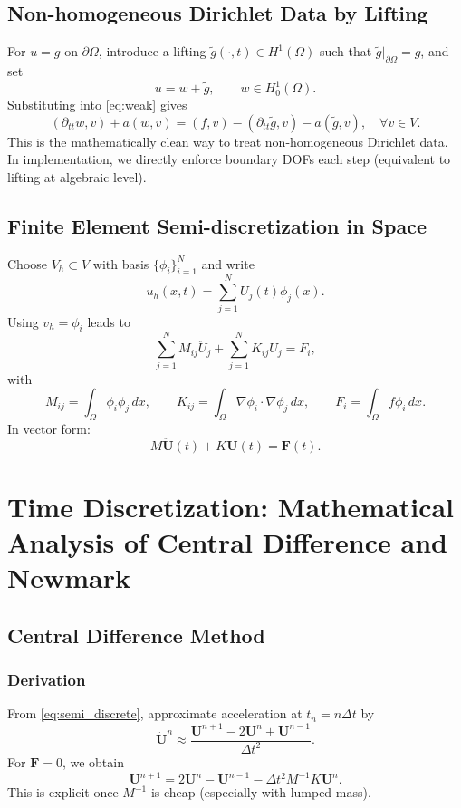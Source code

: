 \documentclass[11pt,a4paper]{report}
\begin{document}
\section{Non-homogeneous Dirichlet Data by Lifting}
For $u=g$ on $\partial\Omega$, introduce a lifting $\tilde g(\cdot,t)\in H^1(\Omega)$ such that $\tilde g|_{\partial\Omega}=g$, and set
\[
u = w+\tilde g,\qquad w\in H_0^1(\Omega).
\]
Substituting into \eqref{eq:weak} gives
\begin{equation}
(\partial_{tt}w,v)+a(w,v)=(f,v) - (\partial_{tt}\tilde g,v)-a(\tilde g,v),\quad \forall v\in V.
\label{eq:lifting}
\end{equation}
This is the mathematically clean way to treat non-homogeneous Dirichlet data. In implementation, we directly enforce boundary DOFs each step (equivalent to lifting at algebraic level).

\section{Finite Element Semi-discretization in Space}
Choose $V_h\subset V$ with basis $\{\phi_i\}_{i=1}^N$ and write
\[
u_h(x,t)=\sum_{j=1}^N U_j(t)\phi_j(x).
\]
Using $v_h=\phi_i$ leads to
\begin{equation}
\sum_{j=1}^N M_{ij}\ddot U_j + \sum_{j=1}^N K_{ij}U_j = F_i,
\end{equation}
with
\begin{equation}
M_{ij}=\int_\Omega \phi_i\phi_j\,dx,\qquad
K_{ij}=\int_\Omega \nabla\phi_i\cdot\nabla\phi_j\,dx,
\qquad
F_i=\int_\Omega f\phi_i\,dx.
\end{equation}
In vector form:
\begin{equation}
M\ddot{\bm U}(t)+K\bm U(t)=\bm F(t).
\label{eq:semi_discrete}
\end{equation}

\chapter{Time Discretization: Mathematical Analysis of Central Difference and Newmark}
\section{Central Difference Method}
\subsection{Derivation}
From \eqref{eq:semi_discrete}, approximate acceleration at $t_n=n\Delta t$ by
\[
\ddot{\bm U}^n\approx \frac{\bm U^{n+1}-2\bm U^n+\bm U^{n-1}}{\Delta t^2}.
\]
For $\bm F=0$, we obtain
\begin{equation}
\bm U^{n+1}=2\bm U^n-\bm U^{n-1}-\Delta t^2 M^{-1}K\bm U^n.
\label{eq:cd_update}
\end{equation}
This is explicit once $M^{-1}$ is cheap (especially with lumped mass).
\end{document}
